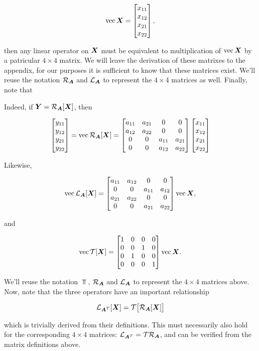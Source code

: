 \documentclass[useAMS,usenatbib]{mn2e}
\newcommand{\mat}[1]{{\bmath{#1}}}
\begin{document}
\newcommand{\VEC}[1]{\mathrm{vec}\,{#1}}

\[
\VEC{\mat{X}} = \Matrix{c}{x_{11}\\x_{12}\\x_{21}\\x_{22}},
\]

then any linear operator on $\mat{X}$ must be equivalent to multiplication of $\VEC{\mat{X}}$ by a patricular $4\times 4$ matrix. We will leave the derivation of these matrixes to the appendix, for our purposes it is sufficient to know that these matrices exist. We'll reuse the notation 
$\Rop{\mat{A}}$ and $\Lop{\mat{A}}$ to represent the $4\times4$ matrices as well. Finally, note that

Indeed, if $\mat{Y}=\Rop{\mat{A}}[\mat{X}]$, then 

\begin{equation}
\Matrix{c}{y_{11}\\y_{12}\\y_{21}\\y_{22}} = \VEC{\Rop{\mat{A}}[\mat{X}]} = 
\Matrix{cccc}{a_{11}&a_{21}&0&0 \\ a_{12}&a_{22}&0&0 \\ 0&0&a_{11}&a_{21} \\ 0&0&a_{12}&a_{22} }
\Matrix{c}{x_{11}\\x_{12}\\x_{21}\\x_{22}} 
\end{equation}

Likewise, 

\begin{equation}
\VEC{\Lop{\mat{A}}[\mat{X}]} = 
\Matrix{cccc}{a_{11}&a_{12}&0&0 \\ 0&0&a_{11}&a_{12} \\ a_{21}&a_{22}&0&0  \\ 0&0&a_{21}&a_{22} }
\VEC{\mat{X}},
\end{equation}

and

\begin{equation}
\VEC{\Top[\mat{X}]} = 
\Matrix{cccc}{1&0&0&0 \\ 0&0&1&0 \\ 0&1&0&0 \\ 0&0&0&1} \VEC{\mat{X}}.
\end{equation}


We'll reuse the notation $\Top$, $\Rop{\mat{A}}$ and $\Lop{\mat{A}}$ to represent the $4\times4$ matrices above. Now, note that the
three operators have an important relationship

\begin{equation}
\Lop{\mat{A}^T}[\mat{X}] = \Top \big[ \Rop{\mat{A}}[\mat{X}] \big ]
\end{equation}

which is trivially derived from their definitions. This must necessarily also hold for the corresponding $4\times4$ matrices:
$\Lop{\mat{A}^T} = \Top \Rop{\mat{A}}$, and can be verified from the matrix definitions above.

\label{lastpage}
\end{document}
